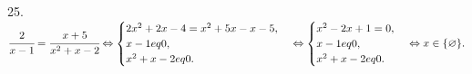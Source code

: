 25. $\cfrac{2}{x-1}=\cfrac{x+5}{x^2+x-2}\Leftrightarrow\begin{cases}
2x^2+2x-4=x^2+5x-x-5,\\
x-1
eq0,\\ x^2+x-2
eq0.\end{cases}\Leftrightarrow  \begin{cases}
x^2-2x+1=0,\\
x-1
eq0,\\ x^2+x-2
eq0.\end{cases}\Leftrightarrow x\in\{\varnothing\}.$\\

